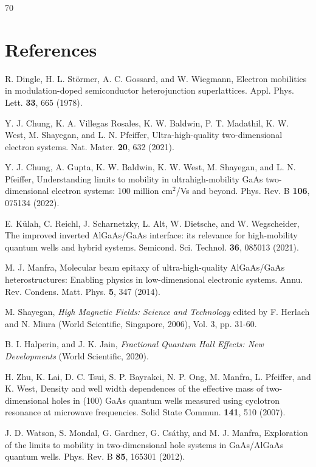 \documentclass[reprint,amsmath,amssymb,aps,prl,nobibnotes,superscriptaddress]{revtex4-1}
\begin{document}
\begin{thebibliography}{70}
\section*{References}
\renewcommand{\theenumiv}{\arabic{enumiv}} %

 R. Dingle, H. L. Störmer, A. C. Gossard, and W. Wiegmann, Electron mobilities in modulation-doped semiconductor heterojunction superlattices. Appl. Phys. Lett. \textbf{33}, 665 (1978).

 Y. J. Chung, K. A. Villegas Rosales, K. W. Baldwin, P. T. Madathil, K. W. West, M. Shayegan, and L. N. Pfeiffer, Ultra-high-quality two-dimensional electron systems. Nat.
Mater. \textbf{20}, 632 (2021).

 Y. J. Chung, A. Gupta, K. W. Baldwin, K. W. West, M. Shayegan, and L. N. Pfeiffer,  Understanding limits to mobility in ultrahigh-mobility GaAs two-dimensional electron systems: 100 million cm$^2$/Vs and beyond.
Phys. Rev. B \textbf{106}, 075134 (2022).

 E. Külah, C. Reichl, J. Scharnetzky, L. Alt, W. Dietsche, and
W. Wegscheider, The improved inverted AlGaAs/GaAs interface: its relevance for high-mobility quantum wells and hybrid systems.  Semicond. Sci. Technol. \textbf{36}, 085013 (2021).

 M. J. Manfra, Molecular beam epitaxy of ultra-high-quality AlGaAs/GaAs heterostructures: Enabling physics in low-dimensional electronic systems. Annu. Rev. Condens. Matt. Phys. \textbf{5}, 347 (2014).

M. Shayegan, \textit{High Magnetic Fields: Science and
Technology} edited
by F. Herlach and N. Miura (World Scientific, Singapore,
2006), Vol. 3, pp. 31-60.

  B. I. Halperin, and J. K. Jain, \textit{Fractional Quantum Hall Effects: New Developments} (World Scientific, 2020).

 H. Zhu, K. Lai, D. C. Tsui, S. P. Bayrakci, N. P. Ong, M. Manfra, L. Pfeiffer, and K. West,  Density and well width dependences of the effective mass of two-dimensional holes
in (100) GaAs quantum wells measured using cyclotron
resonance at microwave frequencies. Solid State Commun.
\textbf{141}, 510 (2007).

 J. D. Watson, S. Mondal, G. Gardner, G. Csáthy, and
M. J. Manfra, Exploration of the limits to mobility in
two-dimensional hole systems in GaAs/AlGaAs quantum
wells. Phys. Rev. B \textbf{85}, 165301 (2012).


\end{thebibliography}
\end{document}
